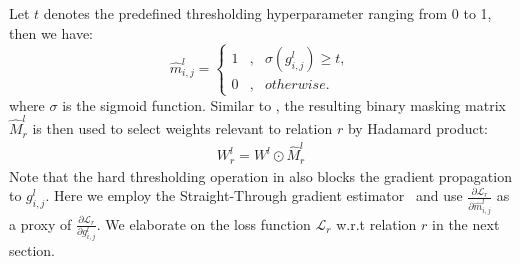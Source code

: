 Let $t$ denotes the predefined thresholding hyperparameter ranging from 0 to 1, then we have:
\begin{equation}
\label{eq:hard}
\hat{m}_{i,j}^l=\left\{
\begin{aligned}
1 & , & \sigma(g_{i,j}^l)\ge t, \\
0 & , & otherwise.
\end{aligned}
\right.
\end{equation}
where $\sigma$ is the sigmoid function. Similar to , the resulting binary masking matrix $\hat{M}_r^l$ is then used to select weights relevant to relation $r$ by Hadamard product:
\begin{align}
	\label{eq:deterministic}
	W_r^l = W^l \odot \hat{M}_r^l
\end{align}
Note that the hard thresholding operation in  also blocks the gradient propagation to $g_{i,j}^l$. Here we employ the Straight-Through gradient estimator~\citep{DBLP:journals/corr/BengioLC13,NIPS2016_d8330f85} and use $\frac{\partial \mathcal{L}_r}{\partial \hat{m}_{i,j}^l}$ as a proxy of $\frac{\partial \mathcal{L}_r}{\partial g_{i,j}^l}$.  We elaborate on the loss function $\mathcal{L}_r$ w.r.t relation $r$ in the next section.

